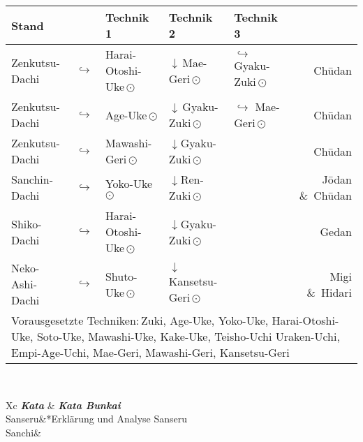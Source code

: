 \begin{tcolorbox}[width=\textwidth,height=\textheight,right=12pt,left=12pt,colframe=BKBELT,colback=white,fonttitle=\bfseries,coltitle=white,title=1. Dan:\indent Kihon-Ido Kata - Partnerformen - Erwartungshorizont]	
	\null\vfill\null
	\begin{tabularx}{\textwidth}{llllXr}
		\textbf{Stand} 	&  	& \textbf{Technik 1} & \textbf{Technik 2} 				& \textbf{Technik 3}&\\
		\midrule
		Zenkutsu-Dachi 	& \(\hookrightarrow\)	& Harai-Otoshi-Uke\,\(\odot\) 	& \(\downarrow\)\,Mae-Geri\,\(\odot\)	& \(\hookrightarrow\) 	 Gyaku-Zuki\,\(\odot\)	& Ch\={u}dan \\
		Zenkutsu-Dachi 	& \(\hookrightarrow\)	& Age-Uke\,\(\odot\) 			& \(\downarrow\)\,Gyaku-Zuki\,\(\odot\) & \(\hookrightarrow\)	 Mae-Geri\,\(\odot\)	& Ch\={u}dan \\
		Zenkutsu-Dachi 	& \(\hookrightarrow\)	& Mawashi-Geri\,\(\odot\) 		& \(\downarrow\)Gyaku-Zuki\,\(\odot\) 				&						&	 					 Ch\={u}dan \\
		Sanchin-Dachi 	& \(\hookrightarrow\)	& Yoko-Uke\,\(\odot\) 			& \(\downarrow\)Ren-Zuki\,\(\odot\) 					&						& 						 J\={o}dan \&~Ch\={u}dan \\
		Shiko-Dachi 	& \(\hookrightarrow\)	& Harai-Otoshi-Uke\,\(\odot\) 	& \(\downarrow\)Gyaku-Zuki\,\(\odot\) 				&						& 						 Gedan \\
		Neko-Ashi-Dachi	& \(\hookrightarrow\)	& Shuto-Uke\,\(\odot\) 			& \(\downarrow\)Kansetsu-Geri\,\(\odot\) 					&						& 						 Migi \&~Hidari  \\
		\multicolumn{6}{p{\linewidth-2\tabcolsep}}{{\footnotesize Vorausgesetzte Techniken:\,Zuki, Age-Uke, Yoko-Uke, Harai-Otoshi-Uke, Soto-Uke, Mawashi-Uke, Kake-Uke, Teisho-Uchi Uraken-Uchi, Empi-Age-Uchi, Mae-Geri, Mawashi-Geri, Kansetsu-Geri}}\\
		\midrule
	\end{tabularx}\\
	\begin{center}
		\begin{minipage}[t]{0.45\textwidth}
			\begin{tabularx}{\textwidth}{Xc}
				\midrule
				\textbf{\textit{Kata}} & \textbf{\textit{Kata Bunkai}} \\
				Sanseru&*{Erklärung und Analyse Sanseru}\\
				Sanchi& \\
				\midrule
			\end{tabularx}

\end{minipage}
\end{center}
\end{tcolorbox}
